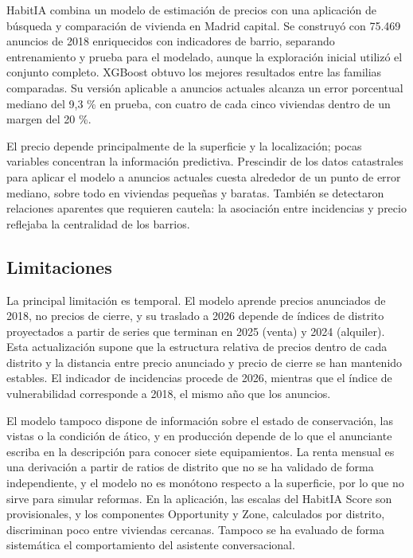 \documentclass[11pt,a4paper]{article}
\begin{document}
HabitIA combina un modelo de estimación de precios con una aplicación de búsqueda y comparación de vivienda en Madrid capital. Se construyó con 75.469 anuncios de 2018 enriquecidos con indicadores de barrio, separando entrenamiento y prueba para el modelado, aunque la exploración inicial utilizó el conjunto completo. XGBoost obtuvo los mejores resultados entre las familias comparadas. Su versión aplicable a anuncios actuales alcanza un error porcentual mediano del 9,3 \% en prueba, con cuatro de cada cinco viviendas dentro de un margen del 20 \%.

El precio depende principalmente de la superficie y la localización; pocas variables concentran la información predictiva. Prescindir de los datos catastrales para aplicar el modelo a anuncios actuales cuesta alrededor de un punto de error mediano, sobre todo en viviendas pequeñas y baratas. También se detectaron relaciones aparentes que requieren cautela: la asociación entre incidencias y precio reflejaba la centralidad de los barrios.

\subsection{Limitaciones}

La principal limitación es temporal. El modelo aprende precios anunciados de 2018, no precios de cierre, y su traslado a 2026 depende de índices de distrito proyectados a partir de series que terminan en 2025 (venta) y 2024 (alquiler). Esta actualización supone que la estructura relativa de precios dentro de cada distrito y la distancia entre precio anunciado y precio de cierre se han mantenido estables. El indicador de incidencias procede de 2026, mientras que el índice de vulnerabilidad corresponde a 2018, el mismo año que los anuncios.

El modelo tampoco dispone de información sobre el estado de conservación, las vistas o la condición de ático, y en producción depende de lo que el anunciante escriba en la descripción para conocer siete equipamientos. La renta mensual es una derivación a partir de ratios de distrito que no se ha validado de forma independiente, y el modelo no es monótono respecto a la superficie, por lo que no sirve para simular reformas. En la aplicación, las escalas del HabitIA Score son provisionales, y los componentes Opportunity y Zone, calculados por distrito, discriminan poco entre viviendas cercanas. Tampoco se ha evaluado de forma sistemática el comportamiento del asistente conversacional.
\end{document}
